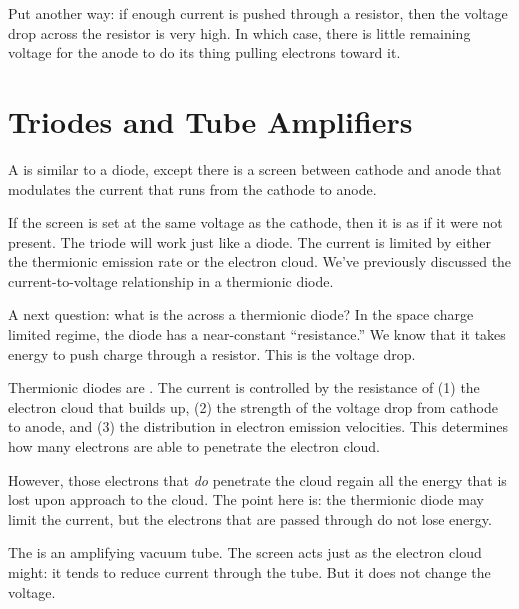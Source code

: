 \documentclass[11pt, oneside]{amsart}
\begin{document}
Put another way: if enough current is pushed through a resistor, then
the voltage drop across the resistor is very high. In which case, there
is little remaining voltage for the anode to do its thing pulling
electrons toward it.


\section{Triodes and Tube Amplifiers}

A  is similar to a diode, except there is a screen
between cathode and anode that modulates the current that runs from the
cathode to anode.

If the screen is set at the same voltage as the cathode, then it is as
if it were not present. The triode will work just like a diode. The
current is limited by either the thermionic emission rate or the
electron cloud. We've previously discussed the current-to-voltage
relationship in a thermionic diode.

A next question: what is the  across a thermionic
diode? In the space charge limited regime, the diode has a near-constant
``resistance.'' We know that it takes energy to push charge through a
resistor. This is the voltage drop.

Thermionic diodes are . The current is controlled by
the resistance of (1) the electron cloud that builds up, (2) the
strength of the voltage drop from cathode to anode, and (3) the
distribution in electron emission velocities. This determines how many
electrons are able to penetrate the electron cloud.

However, those electrons that \emph{do} penetrate the cloud regain all
the energy that is lost upon approach to the cloud. The point here is:
the thermionic diode may limit the current, but the electrons that are
passed through do not lose energy.

The  is an amplifying vacuum tube. The screen acts just
as the electron cloud might: it tends to reduce current through the
tube. But it does not change the voltage.
\end{document}

